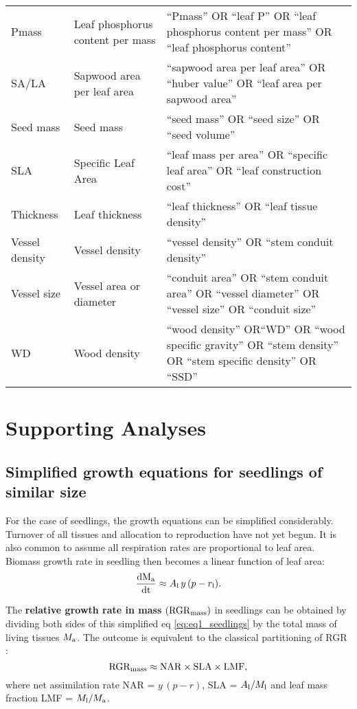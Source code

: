 \documentclass[10pt,twoside]{article}\usepackage[]{graphicx}\usepackage[]{color}
\begin{document}
\begin{table}[h!]
{\begin{tabular}{p{3cm}p{3cm}p{8cm}}
  Pmass & Leaf phosphorus content per mass & ``Pmass'' OR ``leaf P'' OR  ``leaf phosphorus content per mass'' OR ``leaf phosphorus content'' \\
  SA/LA & Sapwood area per leaf area & ``sapwood area per leaf area'' OR ``huber value'' OR ``leaf area per sapwood area'' \\
  Seed mass & Seed mass & ``seed mass'' OR ``seed size'' OR ``seed volume'' \\
  SLA & Specific Leaf Area & ``leaf mass per area'' OR ``specific leaf area'' OR ``leaf construction cost'' \\
  Thickness & Leaf thickness & ``leaf thickness''  OR ``leaf tissue density'' \\
  Vessel density & Vessel density & ``vessel density'' OR ``stem conduit density'' \\
  Vessel size & Vessel area or diameter & ``conduit area'' OR ``stem conduit area'' OR ``vessel diameter'' OR ``vessel size'' OR ``conduit size''   \\
  WD & Wood density & ``wood density'' OR``WD'' OR ``wood specific gravity'' OR ``stem density'' OR ``stem specific density'' OR ``SSD'' \\
   \hline
\end{tabular}
}
\end{table}

\clearpage

\section{Supporting Analyses}\label{app:supp_info_analyses}

\subsection{Simplified growth equations for seedlings of similar size}\label{app:growth-equation}

For the case of seedlings, the growth equations can be simplified considerably. Turnover of all tissues and allocation to reproduction have not yet begun. It is also common to assume all respiration rates are proportional to leaf area. Biomass growth rate in seedling then becomes a linear function of leaf area:
\begin{equation}\label{eq:eq1_seedlings}
{\frac{\ensuremath{\rm{d}}M_{\rm a} }{\ensuremath{\rm{d}}t}}  \approx  A_{\rm l} \, y \, (p - r_{\rm l}).
\end{equation}

The \textbf{relative growth rate in mass} $({\rm RGR}_{{\rm mass}})$ in seedlings can be obtained by dividing both sides of this simplified eq \ref{eq:eq1_seedlings} by the total mass of living tissues $M_{\rm a} $. The outcome is equivalent to the classical partitioning of RGR \citep{Lambers:1992bj, Cornelissen:1998ta}:
\begin{equation}\label{eq:eq1_seedlings_RGR}
{\rm RGR}_{{\rm mass}}  \approx {\rm NAR} \times  {\rm SLA} \times  {\rm LMF},
\end{equation}
where net assimilation rate NAR = $y \, (p - r)$, SLA = $A_{\rm l}/ M_{\rm l}$ and leaf mass fraction LMF = $M_{\rm l}/ M_{\rm a} $.
\end{document}
